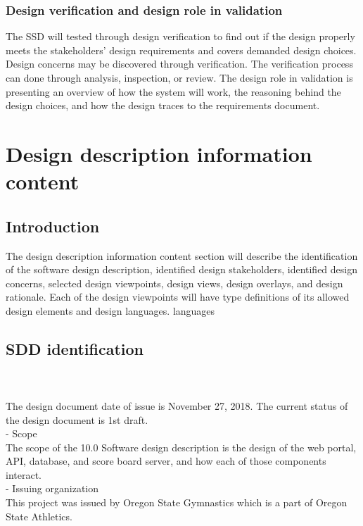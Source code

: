 \documentclass[letterpaper,10pt,draftclsnofoot,onecolumn,]{article}
\begin{document}
\subsubsection{Design verification and design role in validation}
The SSD will tested through design verification to find out if the design properly meets the stakeholders' design requirements and covers demanded design choices. Design concerns may be discovered through verification. The verification process can done through analysis, inspection, or review. The design role in validation is presenting an overview of how the system will work, the reasoning behind the design choices, and  how the design traces to the requirements document. 

\section{Design description information content}
\subsection{Introduction}
The design description information content section will describe the identification of the software design description, identified design stakeholders, identified design concerns, selected design viewpoints, design views, design overlays, and design rationale. Each of the design viewpoints will have type definitions of its allowed design elements and design languages.
languages  
\subsection{SDD identification}\\

\\
The design document date of issue is November 27, 2018. The current status of the design document is 1st draft.\\

- Scope\\
The scope of the 10.0 Software design description is the design of the web portal, API, database, and score board server, and how each of those components interact.\\

- Issuing organization\\
This project was issued by Oregon State Gymnastics which is a part of Oregon State Athletics.\\
\end{document}
